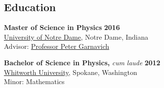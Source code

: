 \documentclass[margin]{res}
\begin{document}
\begin{resume}

\section{Education}

{\bf Master of Science in Physics} \hfill  {\bf 2016}\\
\href{http://physics.nd.edu}{University of Notre Dame}, Notre Dame, Indiana \\ 
Advisor: \href{www.nd.edu/~pgarnavi}{Professor Peter Garnavich}



{\bf Bachelor of Science in Physics,} \textit{cum laude} \hfill \textbf{2012}\\
\href{http://www.whitworth.edu/physics/}{Whitworth University}, Spokane, Washington \\ 
Minor: Mathematics \vspace{-2pt}
 



\end{resume}
\end{document}
